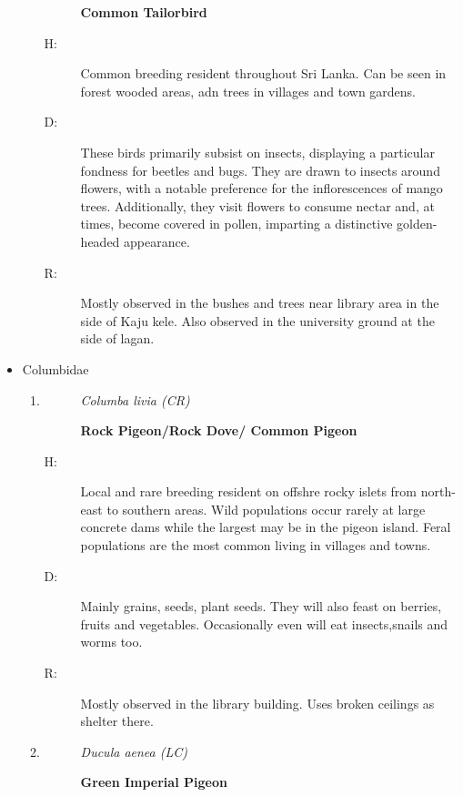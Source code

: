 \begin{itemize}
\begin{enumerate}
\begin{description}
\textbf{Common Tailorbird}%
\end{description}%
\begin{description}%
\item[H: ]%
Common breeding resident throughout Sri Lanka. Can be seen in forest wooded areas, adn trees in villages and town gardens.%
\item[D: ]%
These birds primarily subsist on insects, displaying a particular fondness for beetles and bugs. They are drawn to insects around flowers, with a notable preference for the inflorescences of mango trees. Additionally, they visit flowers to consume nectar and, at times, become covered in pollen, imparting a distinctive golden{-}headed appearance.%
\item[R: ]%
Mostly observed in the bushes and trees near library area in the side of Kaju kele. Also observed in the university ground at the side of lagan.%
\end{description}%
\end{enumerate}%
\item%
Columbidae%
\begin{enumerate}%
\item%
\begin{description}%
\item[]%
\textit{Columba livia (CR)}%
\item[]%
\textbf{Rock Pigeon/Rock Dove/ Common Pigeon}%
\end{description}%
\begin{description}%
\item[H: ]%
Local and rare breeding resident on offshre rocky islets from north{-}east to southern areas. Wild populations occur rarely at large concrete dams while the largest may be in the pigeon island. Feral populations are the most common living in villages and towns. %
\item[D: ]%
Mainly grains, seeds, plant seeds. They will also feast on berries, fruits and vegetables. Occasionally even will eat insects,snails and worms too.%
\item[R: ]%
Mostly observed in the library building. Uses broken ceilings as shelter there.%
\end{description}%
\item%
\begin{description}%
\item[]%
\textit{Ducula aenea (LC)}%
\item[]%
\textbf{Green Imperial Pigeon}%
\end{description}%
\begin{description}%

\end{description}
\end{enumerate}
\end{itemize}
